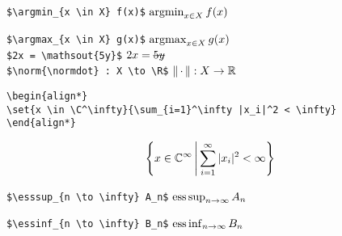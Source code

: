 \documentclass[10pt,jtb]{article}
\begin{document}
\verb|$\argmin_{x \in X} f(x)$| \hfill $\operatorname*{\mathrm{argmin}}_{x \in X} f(x)$

\verb|$\argmax_{x \in X} g(x)$| \hfill $\operatorname*{\mathrm{argmax}}_{x \in X} g(x)$ \\

\verb|$2x = \mathsout{5y}$| \hfill $2x = \mathsout{5y}$ \\

\verb|$\norm{\normdot} : X \to \R$| \hfill $\left\| \, \cdot \, \right\| : X \to \mathbb{R}$ \\


\begin{verbatim}
\begin{align*}
\set{x \in \C^\infty}{\sum_{i=1}^\infty |x_i|^2 < \infty}
\end{align*}
\end{verbatim}
\begin{align*}
\left\{x \in \mathbb{C}^\infty\,\middle|\,\sum_{i=1}^\infty |x_i|^2 < \infty\right\}
\end{align*}

\quad

\verb|$\esssup_{n \to \infty} A_n$| \hfill $\operatorname*{\mathrm{ess \, sup}}_{n \to \infty} A_n$

\verb|$\essinf_{n \to \infty} B_n$| \hfill $\operatorname*{\mathrm{ess \, inf}}_{n \to \infty} B_n$ \\
\end{document}
